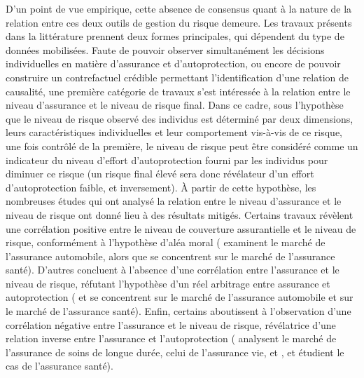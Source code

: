 \begin{Article}
\begin{refsection}[Mouminoux]
D'un point de vue empirique, cette absence de consensus quant à la nature de la relation entre ces deux outils de gestion du risque demeure. Les travaux présents dans la littérature prennent deux formes principales, qui dépendent du type de données mobilisées. Faute de pouvoir observer simultanément les décisions individuelles en matière d'assurance et d'autoprotection, ou encore de pouvoir construire un contrefactuel crédible permettant l'identification d'une relation de causalité, une première catégorie de travaux s'est intéressée à la relation entre le niveau d'assurance et le niveau de risque final. Dans ce cadre, sous l'hypothèse que le niveau de risque observé des individus est déterminé par deux dimensions, leurs caractéristiques individuelles et leur comportement vis-à-vis de ce risque, une fois contrôlé de la première, le niveau de risque peut être considéré comme un indicateur du niveau d'effort d'autoprotection fourni par les individus pour diminuer ce risque (un risque final élevé sera donc révélateur d'un effort d'autoprotection faible, et inversement). À partir de cette hypothèse, les nombreuses études qui ont analysé la relation entre le niveau d'assurance et le niveau de risque ont donné lieu à des résultats mitigés. Certains travaux révèlent une corrélation positive entre le niveau de couverture assurantielle et le niveau de risque, conformément à l'hypothèse d'aléa moral (\textcite{c05,ps94,r99} examinent le marché de l'assurance automobile, alors que \textcite{bcgp04} se concentrent sur le marché de l'assurance santé). D'autres concluent à l'absence d'une corrélation entre l'assurance et le niveau de risque, réfutant l'hypothèse d'un réel arbitrage entre assurance et autoprotection (\textcite{cs00} et \textcite{s06} se concentrent sur le marché de l'assurance automobile et \textcite{ch01} sur le marché de l'assurance santé). Enfin, certains aboutissent à l'observation d'une corrélation négative entre l'assurance et le niveau de risque, révélatrice d'une relation inverse entre l'assurance et l'autoprotection (\textcite{fm06} analysent le marché de l'assurance de soins de longue durée, \textcite{hl03} celui de l'assurance vie, et \textcite{bfjs13}, \textcite{cc17} et \textcite{fks08} étudient le cas de l'assurance santé).


\end{refsection}
\end{Article}
